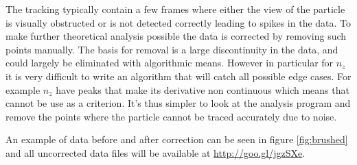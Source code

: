 \label{sec:brushing}
The tracking typically contain a few frames where either the view of the particle is visually obstructed or is not detected correctly 
leading to spikes in the data. To make further theoretical analysis possible the data is corrected by removing such points manually. The basis for removal is a large discontinuity in the data, and could largely be eliminated with algorithmic means. However in particular for $n_z$ it is very difficult to write an algorithm that will catch all possible edge cases. For example $n_z$ have peaks that make its derivative non continuous which means that cannot be use as a criterion. It's thus simpler to look at the analysis program and remove the points where the particle cannot be traced accurately due to noise. 

An example of data before and after correction can be seen in figure \ref{fig:brushed} and all uncorrected data files will be available at \url{http://goo.gl/jgzSXe}.

